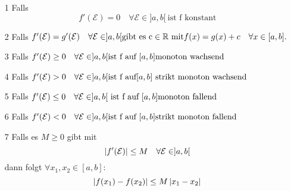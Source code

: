 \begin{enumerate}
    \item [1] Falls \[f'(\mathcal{E}) = 0 \quad \forall \mathcal{E} \in ]a,b[ \  \text{ist f konstant}\]
    \item [2] Falls \(f'(\mathcal{E}) = g'(\mathcal{E}) \quad \forall \mathcal{E} \in ]a,b[ \\ \text{gibt es c} \in \mathbb{R} \text{ mit} f(x) = g(x) + c \quad \forall x \in [a,b].\)
    \item [3] Falls \(f'(\mathcal{E}) \geq 0 \quad \forall \mathcal{E} \in ]a,b[ \\ \text{ist f auf } [a,b] \text{monoton wachsend}\)
    \item [4] Falls \(f'(\mathcal{E}) > 0 \quad \forall \mathcal{E} \in ]a,b[ \\ \text{ist f auf} [a,b] \text{ strikt monoton wachsend}\)
    \item [5] Falls \(f'(\mathcal{E}) \leq 0 \quad \forall \mathcal{E} \in ]a,b[ \\\text{ ist f auf } [a,b] \text{monoton fallend}\)
    \item [6] Falls \(f'(\mathcal{E}) < 0 \quad \forall \mathcal{E} \in ]a,b[ \\ \text{ist f auf } [a,b] \text{strikt monoton fallend}\)
    \item [7] Falls es \(M \geq 0 \) gibt mit
    \[\left\lvert f'(\mathcal{E}) \right\rvert \leq M \quad \forall \mathcal{E} \in ]a,b[\]
    dann folgt \( \forall x_1, x_2 \in [a,b] : \)
    \[\left\lvert f(x_1) - f(x_2) \right\rvert \leq M \left\lvert x_1 - x_2 \right\rvert\]
\end{enumerate}
\Bsp[4.19]
